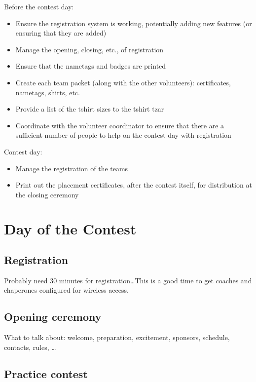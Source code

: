 \documentclass[11pt,twoside,letterpaper]{book}
\newenvironment{itemlist}{
\begin{itemize}
\setlength{\itemsep}{0pt}
\setlength{\parskip}{0pt}}
{\end{itemize}}
\begin{document}
\noindent Before the contest day:

\begin{itemlist}
\item Ensure the registration system is working, potentially adding
  new features (or ensuring that they are added)
\item Manage the opening, closing, etc., of registration
\item Ensure that the nametags and badges are printed
\item Create each team packet (along with the other volunteers):
  certificates, nametags, shirts, etc.
\item Provide a list of the tshirt sizes to the tshirt tzar
\item Coordinate with the volunteer coordinator to ensure that there
  are a sufficient number of people to help on the contest day with
  registration
\end{itemlist}

\noindent Contest day:

\begin{itemlist}
\item Manage the registration of the teams
\item Print out the placement certificates, after the contest itself,
  for distribution at the closing ceremony
\end{itemlist}



\section{Day of the Contest}

\subsection{Registration}

Probably need 30 minutes for registration\ldots This is a good time to
get coaches and chaperones configured for wireless access.

\subsection{Opening ceremony}

What to talk about: welcome, preparation, excitement, sponsors,
schedule, contacts, rules, \ldots

\subsection{Practice contest}
\end{document}
